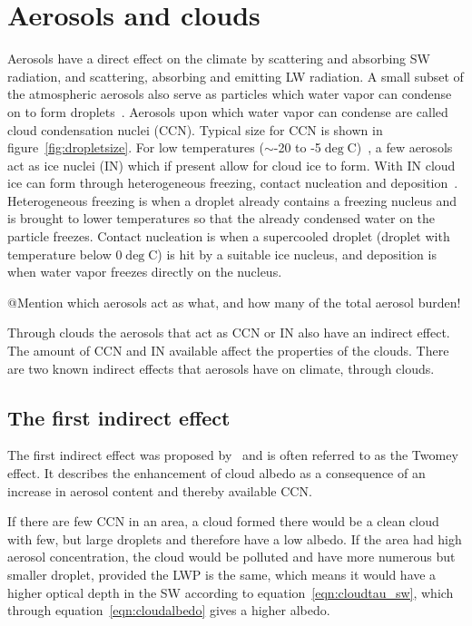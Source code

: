 \section{Aerosols and clouds}
Aerosols have a direct effect on the climate by scattering and absorbing SW radiation, and scattering, absorbing and emitting LW radiation. A small subset of the atmospheric aerosols also serve as particles which water vapor can condense on to form droplets~\citep{Wallace2006}. Aerosols upon which water vapor can condense are called cloud condensation nuclei (CCN). Typical size for CCN is shown in figure~\ref{fig:dropletsize}. For low temperatures ($\sim$-20 to -5$\deg$C)~\citep{Wallace2006}, a few aerosols act as ice nuclei (IN) which if present allow for cloud ice to form. With IN cloud ice can form through heterogeneous freezing, contact nucleation and deposition~\citep{Wallace2006}. Heterogeneous freezing is when a droplet already contains a freezing nucleus and is brought to lower temperatures so that the already condensed water on the particle freezes. Contact nucleation is when a supercooled droplet (droplet with temperature below 0$\deg$C) is hit by a suitable ice nucleus, and deposition is when water vapor freezes directly on the nucleus.

@Mention which aerosols act as what, and how many of the total aerosol burden!

Through clouds the aerosols that act as CCN or IN also have an indirect effect. The amount of CCN and IN available affect the properties of the clouds. There are two known indirect effects that aerosols have on climate, through clouds.
 
\subsection{The first indirect effect}
The first indirect effect was proposed by~\citet{Twomey1974} and is often referred to as the Twomey effect. It describes the enhancement of cloud albedo as a consequence of an increase in aerosol content and thereby available CCN.

If there are few CCN in an area, a cloud formed there would be a clean cloud with few, but large droplets and therefore have a low albedo. If the area had high aerosol concentration, the cloud would be polluted and have more numerous but smaller droplet, provided the LWP is the same, which means it would have a higher optical depth in the SW according to equation~\ref{eqn:cloudtau_sw}, which through equation~\ref{eqn:cloudalbedo} gives a higher albedo.

